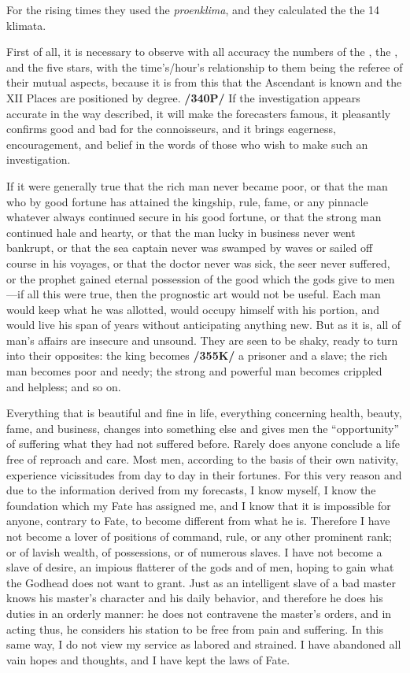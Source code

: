 For the rising times they used the \textit{proenklima}, and they calculated the the 14 klimata.

First of all, it is necessary to observe with all accuracy the numbers of the \Sun, the \Moon, and the five stars, with the time’s/hour’s relationship to them being the referee of their mutual aspects, because it is from this that the Ascendant is known and the XII Places are positioned by degree. \textbf{/340P/} If the investigation appears accurate in the way described, it will make the forecasters famous, it pleasantly confirms good and bad for the connoisseurs, and it brings eagerness, encouragement, and belief in the words of those who wish to make such an investigation.

If it were generally true that the rich man never became poor, or that the man who by good fortune has attained the kingship, rule, fame, or any pinnacle whatever always continued secure in his good fortune, or
that the strong man continued hale and hearty, or that the man lucky in business never went bankrupt, or that the sea captain never was swamped by waves or sailed off course in his voyages, or that the doctor never was sick, the seer never suffered, or the prophet gained eternal possession of the good which the gods give to men—if all this were true, then the prognostic art would not be useful. Each man would keep what he was allotted, would occupy himself with his portion, and would live his span of years without anticipating anything new. But as it is, all of man’s affairs are insecure and unsound. They are seen to be shaky, ready to turn into their opposites: the king becomes \textbf{/355K/} a prisoner and a slave; the rich man becomes poor and needy; the strong and powerful man becomes crippled and helpless; and so on.

Everything that is beautiful and fine in life, everything concerning health, beauty, fame, and business, changes into something else and gives men the “opportunity” of suffering what they had not suffered before. Rarely does anyone conclude a life free of reproach and care. Most men, according to the basis of their own nativity, experience vicissitudes from day to day in their fortunes. For this very reason and due to the information derived from my forecasts, I know myself, I know the foundation which my Fate has assigned me, and I know that it is impossible for anyone, contrary to Fate, to become different from what he is. Therefore I have not become a lover of positions of command, rule, or any other prominent rank; or of lavish wealth, of possessions, or of numerous slaves. I have not become a slave of desire, an impious flatterer of the gods and of men, hoping to gain what the Godhead does not want to grant. Just as an intelligent slave of a bad master knows his master’s character and his daily behavior,
and therefore he does his duties in an orderly manner: he does not contravene the master’s orders, and in acting thus, he considers his station to be free from pain and suffering. In this same way, I do not view my service as labored and strained. I have abandoned all vain hopes and thoughts, and I have kept the laws of Fate.

